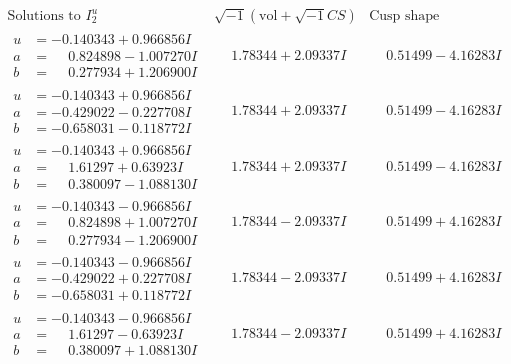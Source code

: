 \documentclass[1p]{elsarticle_modified}
\theoremstyle{definition}
\newcommand{\I}{\sqrt{-1}}
\begin{document}
$$\begin{array}{c|c|c}  
\text{Solutions to }I^u_{2}& \I (\text{vol} + \sqrt{-1}CS) & \text{Cusp shape}\\
 \hline 
\begin{aligned}
u &= -0.140343 + 0.966856 I \\
a &= \phantom{-}0.824898 - 1.007270 I \\
b &= \phantom{-}0.277934 + 1.206900 I\end{aligned}
 & \phantom{-}1.78344 + 2.09337 I & \phantom{-}0.51499 - 4.16283 I \\ \hline\begin{aligned}
u &= -0.140343 + 0.966856 I \\
a &= -0.429022 - 0.227708 I \\
b &= -0.658031 - 0.118772 I\end{aligned}
 & \phantom{-}1.78344 + 2.09337 I & \phantom{-}0.51499 - 4.16283 I \\ \hline\begin{aligned}
u &= -0.140343 + 0.966856 I \\
a &= \phantom{-}1.61297 + 0.63923 I \\
b &= \phantom{-}0.380097 - 1.088130 I\end{aligned}
 & \phantom{-}1.78344 + 2.09337 I & \phantom{-}0.51499 - 4.16283 I \\ \hline\begin{aligned}
u &= -0.140343 - 0.966856 I \\
a &= \phantom{-}0.824898 + 1.007270 I \\
b &= \phantom{-}0.277934 - 1.206900 I\end{aligned}
 & \phantom{-}1.78344 - 2.09337 I & \phantom{-}0.51499 + 4.16283 I \\ \hline\begin{aligned}
u &= -0.140343 - 0.966856 I \\
a &= -0.429022 + 0.227708 I \\
b &= -0.658031 + 0.118772 I\end{aligned}
 & \phantom{-}1.78344 - 2.09337 I & \phantom{-}0.51499 + 4.16283 I \\ \hline\begin{aligned}
u &= -0.140343 - 0.966856 I \\
a &= \phantom{-}1.61297 - 0.63923 I \\
b &= \phantom{-}0.380097 + 1.088130 I\end{aligned}
 & \phantom{-}1.78344 - 2.09337 I & \phantom{-}0.51499 + 4.16283 I \\ \hline\begin{aligned}

\end{aligned}
\end{array}$$
\end{document}
